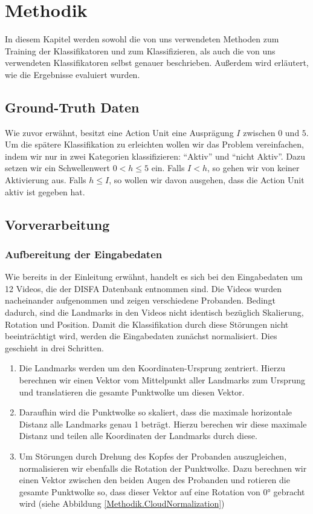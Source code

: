 \chapter{Methodik}\label{ch:methodik}
In diesem Kapitel werden sowohl die von uns verwendeten Methoden zum Training der Klassifikatoren und zum Klassifizieren,
als auch die von uns verwendeten Klassifikatoren selbst genauer beschrieben. Außerdem wird erläutert, wie die Ergebnisse
evaluiert wurden.

\section{Ground-Truth Daten}
Wie zuvor erwähnt, besitzt eine Action Unit eine Ausprägung $I$ zwischen $0$ und $5$. Um die spätere Klassifikation zu erleichten wollen wir das Problem vereinfachen, indem wir nur in zwei Kategorien klassifizieren: "`Aktiv"' und "`nicht Aktiv"'. Dazu setzen wir ein Schwellenwert $0<h\leq5$ ein. Falls $I<h$, so gehen wir von keiner Aktivierung aus. Falls $h\leq I$, so wollen wir davon ausgehen, dass die Action Unit aktiv ist gegeben hat.
\section{Vorverarbeitung}
\subsection{Aufbereitung der Eingabedaten}
Wie bereits in der Einleitung erwähnt, handelt es sich bei den Eingabedaten um 12 Videos, die der DISFA Datenbank entnommen sind.
Die Videos wurden nacheinander aufgenommen und zeigen verschiedene Probanden. Bedingt dadurch, sind die Landmarks
in den Videos nicht identisch bezüglich Skalierung, Rotation und Position.\newline
Damit die Klassifikation durch diese Störungen nicht beeinträchtigt wird, werden die Eingabedaten zunächst normalisiert. Dies geschieht
in drei Schritten.
\begin{enumerate}
  \item Die Landmarks werden um den Koordinaten-Ursprung zentriert. Hierzu berechnen wir einen Vektor vom Mittelpunkt aller Landmarks zum Ursprung und translatieren
        die gesamte Punktwolke um diesen Vektor.
  \item Daraufhin wird die Punktwolke so skaliert, dass die maximale horizontale Distanz alle Landmarks genau 1 beträgt. Hierzu berechen wir diese maximale Distanz und
        teilen alle Koordinaten der Landmarks durch diese.
  \item Um Störungen durch Drehung des Kopfes der Probanden auszugleichen, normalisieren wir ebenfalls die Rotation der Punktwolke. Dazu berechnen wir einen Vektor
    zwischen den beiden Augen des Probanden und rotieren die gesamte Punktwolke so, dass dieser Vektor auf eine Rotation von 0° gebracht wird (siehe Abbildung \ref{Methodik.CloudNormalization})
\end{enumerate}


